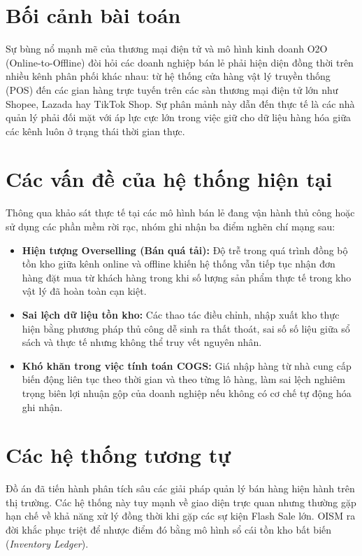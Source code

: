 \documentclass[12pt,a4paper]{report}
\begin{document}
	\section{Bối cảnh bài toán}
	Sự bùng nổ mạnh mẽ của thương mại điện tử và mô hình kinh doanh O2O (Online-to-Offline) đòi hỏi các doanh nghiệp bán lẻ phải hiện diện đồng thời trên nhiều kênh phân phối khác nhau: từ hệ thống cửa hàng vật lý truyền thống (POS) đến các gian hàng trực tuyến trên các sàn thương mại điện tử lớn như Shopee, Lazada hay TikTok Shop. Sự phân mảnh này dẫn đến thực tế là các nhà quản lý phải đối mặt với áp lực cực lớn trong việc giữ cho dữ liệu hàng hóa giữa các kênh luôn ở trạng thái thời gian thực.
	
	\section{Các vấn đề của hệ thống hiện tại}
	Thông qua khảo sát thực tế tại các mô hình bán lẻ đang vận hành thủ công hoặc sử dụng các phần mềm rời rạc, nhóm ghi nhận ba điểm nghẽn chí mạng sau:
	\begin{itemize}
		\item \textbf{Hiện tượng Overselling (Bán quá tải):} Độ trễ trong quá trình đồng bộ tồn kho giữa kênh online và offline khiến hệ thống vẫn tiếp tục nhận đơn hàng đặt mua từ khách hàng trong khi số lượng sản phẩm thực tế trong kho vật lý đã hoàn toàn cạn kiệt.
		\item \textbf{Sai lệch dữ liệu tồn kho:} Các thao tác điều chỉnh, nhập xuất kho thực hiện bằng phương pháp thủ công dễ sinh ra thất thoát, sai số số liệu giữa sổ sách và thực tế nhưng không thể truy vết nguyên nhân.
		\item \textbf{Khó khăn trong việc tính toán COGS:} Giá nhập hàng từ nhà cung cấp biến động liên tục theo thời gian và theo từng lô hàng, làm sai lệch nghiêm trọng biên lợi nhuận gộp của doanh nghiệp nếu không có cơ chế tự động hóa ghi nhận.
	\end{itemize}
	
	\section{Các hệ thống tương tự}
	Đồ án đã tiến hành phân tích sâu các giải pháp quản lý bán hàng hiện hành trên thị trường. Các hệ thống này tuy mạnh về giao diện trực quan nhưng thường gặp hạn chế về khả năng xử lý đồng thời khi gặp các sự kiện Flash Sale lớn. OISM ra đời khắc phục triệt để nhược điểm đó bằng mô hình sổ cái tồn kho bất biến (\textit{Inventory Ledger}).
	
\end{document}
